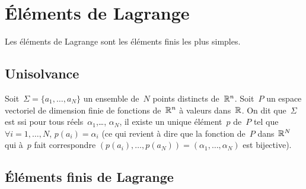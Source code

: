 \medskip
\section{Éléments de Lagrange}

Les éléments de Lagrange sont les éléments finis les plus simples.

\medskip
\subsection{Unisolvance}\label{Sec-unisolvance}

\begin{definition}[Unisolvance]
Soit~$\Sigma=\{a_1,\ldots, a_N\}$ un ensemble de~$N$ points distincts de~$\mathbb R^n$.
Soit~$P$ un espace vectoriel de dimension finie de fonctions de~$\mathbb R^n$ à valeurs dans~$\mathbb R$.
On dit que~$\Sigma$ est  ssi pour tous réels~$\alpha_1$,\ldots, $\alpha_N$, il existe un unique élément~$p$ de~$P$ tel que~$\forall i=1,\ldots, N$, $p(a_i) = \alpha_i$ (ce qui revient à dire que la fonction de~$P$ dans~$\mathbb R^N$ qui à~$p$ fait correspondre $(p(a_i),\ldots, p(a_N))=(\alpha_1,\ldots, \alpha_N)$ est bijective).
\end{definition}

\medskip
\subsection{Éléments finis de Lagrange}

